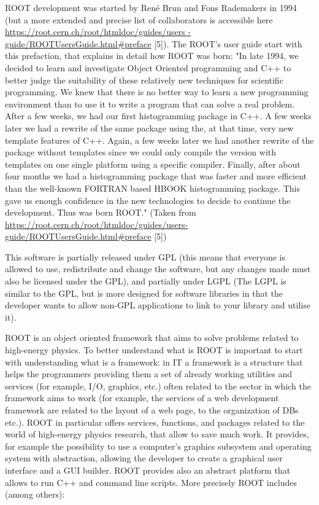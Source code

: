 ROOT development was started by René Brun and Fons Rademakers in 1994 (but a more extended and precise list of collaborators is accessible here \url{https://root.cern.ch/root/htmldoc/guides/users -guide/ROOTUsersGuide.html#preface} [5]). 
The ROOT's user guide start with this prefaction, that explains in detail how ROOT was born:
"In late 1994, we decided to learn and investigate Object Oriented programming and C++ to better judge the suitability of these relatively new techniques for scientific programming. We knew that there is no better way to learn a new programming environment than to use it to write a program that can solve a real problem. After a few weeks, we had our first histogramming package in C++. A few weeks later we had a rewrite of the same package using the, at that time, very new template features of C++. Again, a few weeks later we had another rewrite of the package without templates since we could only compile the version with templates on one single platform using a specific compiler. Finally, after about four months we had a histogramming package that was faster and more efficient than the well-known FORTRAN based HBOOK histogramming package. This gave us enough confidence in the new technologies to decide to continue the development. Thus was born ROOT."
(Taken from \url{https://root.cern.ch/root/htmldoc/guides/users-guide/ROOTUsersGuide.html#preface} [5])


This software is partially released under GPL (this means that everyone is allowed to use, redistribute and change the software, but any changes made must also be licensed under the GPL), and partially under LGPL (The LGPL is similar to the GPL, but is more designed for software libraries in that the developer wants to allow non-GPL applications to link to your library and utilise it).

ROOT is an object oriented framework that aims to solve problems related to high-energy physics. To better understand what is ROOT is important to start with understanding what is a framework: in IT a framework is a structure that helps the programmers providing them a set of already working utilities and services (for example, I/O, graphics, etc.) often related to the sector in which the framework aims to work (for example, the services of a web development framework are related to the layout of a web page, to the organization of DBs etc.). ROOT in particular offers services, functions, and packages related to the world of high-energy physics research, that allow to save much work.
It provides, for example the possibility to use a computer's graphics subsystem and operating system with abstraction, allowing the developer to create a graphical user interface and a GUI builder. ROOT provides also an abstract platform that allows to run C++ and command line scripts. More precisely ROOT includes (among others):

